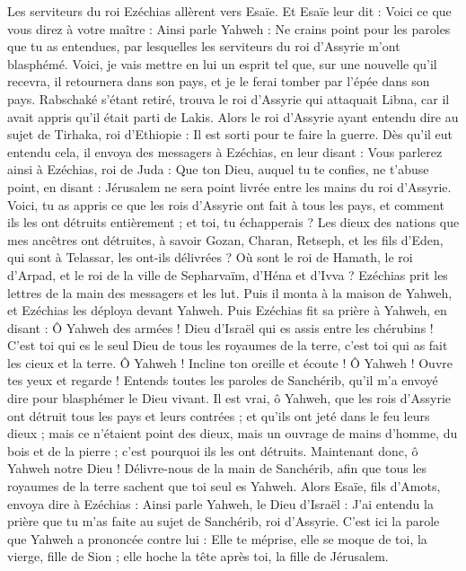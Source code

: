 \begin{multicols}{2}
{Les serviteurs du roi Ezéchias allèrent vers Esaïe.
Et Esaïe leur dit : Voici ce que vous direz à votre maître : Ainsi parle Yahweh : Ne crains point pour les paroles que tu as entendues, par lesquelles les serviteurs du roi d’Assyrie m'ont blasphémé.
Voici, je vais mettre en lui un esprit tel que, sur une nouvelle qu’il recevra, il retournera dans son pays, et je le ferai tomber par l'épée dans son pays.
Rabschaké s’étant retiré, trouva le roi d’Assyrie qui attaquait Libna, car il avait appris qu'il était parti de Lakis.
Alors le roi d’Assyrie ayant entendu dire au sujet de Tirhaka, roi d'Ethiopie : Il est sorti pour te faire la guerre. Dès qu’il eut entendu cela, il envoya des messagers à Ezéchias, en leur disant :
Vous parlerez ainsi à Ezéchias, roi de Juda : Que ton Dieu, auquel tu te confies, ne t'abuse point, en disant : Jérusalem ne sera point livrée entre les mains du roi d’Assyrie.
Voici, tu as appris ce que les rois d’Assyrie ont fait à tous les pays, et comment ils les ont détruits entièrement ; et toi, tu échapperais ?
Les dieux des nations que mes ancêtres ont détruites, à savoir Gozan, Charan, Retseph, et les fils d’Eden, qui sont à Telassar, les ont-ils délivrées ?
Où sont le roi de Hamath, le roi d'Arpad, et le roi de la ville de Sepharvaïm, d’Héna et d’Ivva ?
Ezéchias prit les lettres de la main des messagers et les lut. Puis il monta à la maison de Yahweh, et Ezéchias les déploya devant Yahweh.
Puis Ezéchias fit sa prière à Yahweh, en disant :
Ô Yahweh des armées ! Dieu d'Israël qui es assis entre les chérubins ! C’est toi qui es le seul Dieu de tous les royaumes de la terre, c’est toi qui as fait les cieux et la terre.
Ô Yahweh ! Incline ton oreille et écoute ! Ô Yahweh ! Ouvre tes yeux et regarde ! Entends toutes les paroles de Sanchérib, qu’il m'a envoyé dire pour blasphémer le Dieu vivant.
Il est vrai, ô Yahweh, que les rois d’Assyrie ont détruit tous les pays et leurs contrées ;
et qu'ils ont jeté dans le feu leurs dieux ; mais ce n'étaient point des dieux, mais un ouvrage de mains d'homme, du bois et de la pierre ; c'est pourquoi ils les ont détruits.
Maintenant donc, ô Yahweh notre Dieu ! Délivre-nous de la main de Sanchérib, afin que tous les royaumes de la terre sachent que toi seul es Yahweh.
Alors Esaïe, fils d'Amots, envoya dire à Ezéchias : Ainsi parle Yahweh, le Dieu d'Israël : J’ai entendu la prière que tu m’as faite au sujet de Sanchérib, roi d’Assyrie.
C'est ici la parole que Yahweh a prononcée contre lui : Elle te méprise, elle se moque de toi, la vierge, fille de Sion ; elle hoche la tête après toi, la fille de Jérusalem.
}
\end{multicols}
